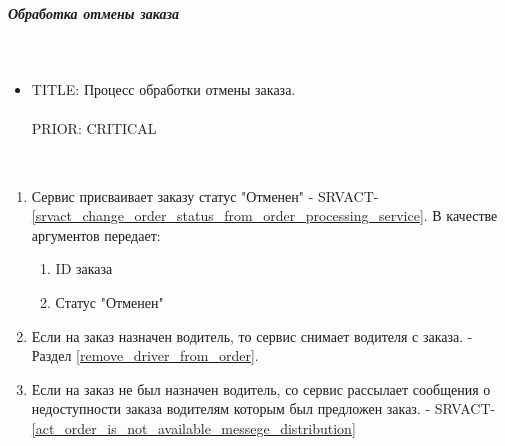 \subparagraph{Обработка отмены заказа} \mbox{}\\

  \begin{itemize}

    \item {
      TITLE: Процесс обработки отмены заказа.\\
      \\
      PRIOR: CRITICAL\\
    }

  \end{itemize}

  \begin{alg}\label{cancel_order_alg} \mbox{}\\

    \begin{enumerate}

      \item Сервис присваивает заказу статус "Отменен" - SRVACT-\ref{srvact_change_order_status_from_order_processing_service}. В качестве аргументов передает: 

                \begin{enumerate}
                  \item ID заказа 
                  \item Статус "Отменен"
                \end{enumerate} 

      \item Если на заказ назначен водитель, то сервис снимает водителя с заказа. - Раздел \ref{remove_driver_from_order}.

      \item Если на заказ не был назначен водитель, со сервис рассылает сообщения о недоступности заказа водителям которым был предложен заказ. -  SRVACT-\ref{act_order_is_not_available_messege_distribution}

    \end{enumerate}

  \end{alg}